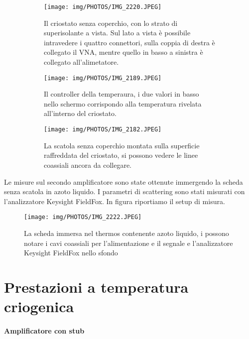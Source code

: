 \documentclass[12pt,oneside]{book}
\begin{document}
\begin{figure}[!htbp]
    \centering
    \begin{subfigure}[t]{0.48\textwidth}
        \centering
        \texttt{[image: img/PHOTOS/IMG\_2220.JPEG]}
        \caption{Il criostato senza coperchio, con lo strato di superisolante a vista. Sul lato a vista è possibile intravedere i quattro connettori, sulla coppia di destra è collegato il VNA, mentre quello in basso a sinistra è collegato all'alimetatore.}
    \end{subfigure}
    \hfill
    \begin{subfigure}[t]{0.48\textwidth}
        \centering
        \texttt{[image: img/PHOTOS/IMG\_2189.JPEG]}
        \caption{Il controller della temperaura, i due valori in basso nello schermo corrispondo alla temperatura rivelata all'interno del criostato.}
    \end{subfigure}
    \hfill
    \begin{subfigure}[t]{0.7\textwidth}
        \centering
        \texttt{[image: img/PHOTOS/IMG\_2182.JPEG]}
        \caption{La scatola senza coperchio montata sulla superficie raffreddata del criostato, si possono vedere le linee coassiali ancora da collegare.}
    \end{subfigure}
    \hfill
    \caption{}
\end{figure}


Le misure sul secondo amplificatore sono state ottenute immergendo la scheda senza scatola in azoto liquido. I parametri di scattering sono stati misurati con l'analizzatore Keysight FieldFox. In figura riportiamo il setup di misura.

\begin{figure}[!htbp]
    \centering
        
    \texttt{[image: img/PHOTOS/IMG\_2222.JPEG]}
    \caption{La scheda immersa nel thermos contenente azoto liquido, i possono notare i cavi coassiali per l'alimentazione e il segnale e l'analizzatore Keysight FieldFox nello sfondo}
    \label{ln2_setup}
\end{figure}


\section{Prestazioni a temperatura criogenica}

\paragraph{Amplificatore con stub}
\end{document}
